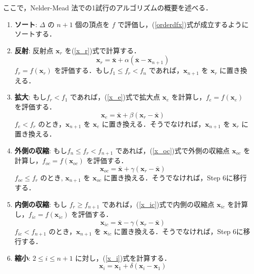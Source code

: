 \documentclass[twocolumn]{jarticle}
\begin{document}
    ここで，Nelder-Mead 法での1試行のアルゴリズムの概要を述べる．
    \begin{enumerate}
        \item \textbf{ソート}: $\Delta$ の $n+1$ 個の頂点を $f$ で評価し，(\ref{orderdfx})式が成立するようにソートする．
        \item \textbf{反射}: 反射点 $\bm{x}_r$ を(\ref{x_r})式で計算する．
        \begin{equation}
            \label{x_r}
            \bm{x}_r = \bar{\bm{x}} + \alpha(\bar{\bm{x}} - \bm{x}_{n+1})
        \end{equation}
        $f_r = f(\bm{x}_r)$ を評価する．もし$f_1 \leq f_r < f_n$ であれば，$\bm{x}_{n+1}$ を $\bm{x}_r$ に置き換える．
        \item \textbf{拡大}: もし$f_r < f_1$ であれば，(\ref{x_e})式で拡大点 $\bm{x}_e$ を計算し，$f_e = f(\bm{x}_e)$ を評価する．
        \begin{equation}
            \label{x_e}
            \bm{x}_e = \bar{\bm{x}} + \beta(\bm{x}_r - \bar{\bm{x}})
        \end{equation}
        $f_e < f_r$ のとき，$\bm{x}_{n+1}$ を $\bm{x}_e$ に置き換える．そうでなければ，$\bm{x}_{n+1}$ を $\bm{x}_r$ に置き換える．
        \item \textbf{外側の収縮}: もし$f_n \leq f_r < f_{n+1}$ であれば，(\ref{x_oc})式で外側の収縮点 $\bm{x}_{oc}$ を計算し，$f_{oc} = f(\bm{x}_{oc})$ を評価する．
        \begin{equation}
            \label{x_oc}
            \bm{x}_{oc} = \bar{\bm{x}} + \gamma(\bm{x}_r - \bar{\bm{x}})
        \end{equation}
        $f_{oc} \leq f_r$ のとき, $\bm{x}_{n+1}$ を $\bm{x}_{oc}$ に置き換える．そうでなければ，Step 6に移行する．
        \item \textbf{内側の収縮}: もし $f_r \geq f_{n+1}$ であれば，(\ref{x_ic})式で内側の収縮点 $\bm{x}_{ic}$ を計算し，$f_{ic} = f(\bm{x}_{ic})$ を評価する．
        \begin{equation}
            \label{x_ic}
            \bm{x}_{ic} = \bar{\bm{x}} - \gamma(\bm{x}_r - \bar{\bm{x}})
        \end{equation}
        $f_{ic} < f_{n+1}$ のとき，$\bm{x}_{n+1}$ を $\bm{x}_{ic}$ に置き換える．そうでなければ，Step 6に移行する．
        \item \textbf{縮小}: $2 \leq i \leq n+1$ に対し，(\ref{x_i})式を計算する．
        \begin{equation}
            \label{x_i}
            \bm{x}_i = \bm{x}_1 + \delta(\bm{x}_i - \bm{x}_1)
        \end{equation}
    \end{enumerate}
\end{document}
